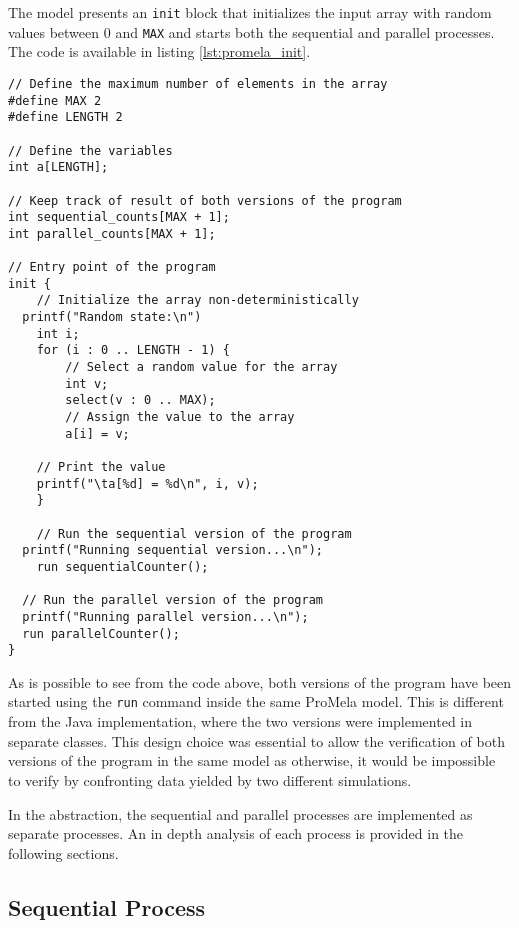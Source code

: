 \documentclass[a4paper, 11pt]{article}
\begin{document}
The model presents an \texttt{init} block that initializes the input array with random values between 0 and \texttt{MAX} and starts both the sequential and parallel processes. The code is available in listing \ref{lst:promela_init}.

\begin{lstlisting}[language=Promela, caption={ProMeLa array intiialization and start of sequential and parallel processes}, captionpos=b, breaklines=true, label={lst:promela_init}]
// Define the maximum number of elements in the array
#define MAX 2
#define LENGTH 2

// Define the variables
int a[LENGTH];

// Keep track of result of both versions of the program
int sequential_counts[MAX + 1];
int parallel_counts[MAX + 1];

// Entry point of the program
init {
	// Initialize the array non-deterministically
  printf("Random state:\n")
	int i;
	for (i : 0 .. LENGTH - 1) {
		// Select a random value for the array
		int v;
		select(v : 0 .. MAX);
		// Assign the value to the array
		a[i] = v;

    // Print the value
    printf("\ta[%d] = %d\n", i, v);
	}

	// Run the sequential version of the program
  printf("Running sequential version...\n");
	run sequentialCounter();
 
  // Run the parallel version of the program
  printf("Running parallel version...\n");
  run parallelCounter();
}
\end{lstlisting}

\noindent As is possible to see from the code above, both versions of the program have been started using the \texttt{run} command inside the same ProMela model. This is different from the Java implementation, where the two versions were implemented in separate classes. This design choice was essential to allow the verification of both versions of the program in the same model as otherwise, it would be impossible to verify by confronting data yielded by two different simulations.

In the abstraction, the sequential and parallel processes are implemented as separate processes. An in depth analysis of each process is provided in the following sections.

\subsection{Sequential Process}
\end{document}
